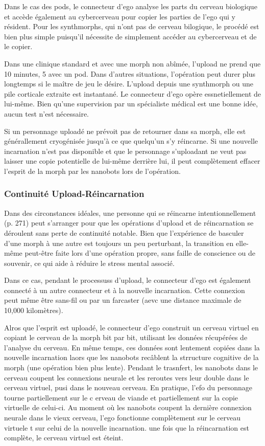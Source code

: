 Dans le cas des pods, le connecteur d'ego analyse les parts du cerveau biologique et accède également au cybercerveau pour copier les parties de l'ego qui y résident. Pour les synthmorphs, qui n'ont pas de cerveau bilogique, le procédé est bien plus simple puisqu'il nécessite de simplement accéder au cybercerveau et de le copier. 

Dans une clinique standard et avec une morph non abîmée, l'upload ne prend que 10 minutes, 5 avec un pod. Dans d'autres situations, l'opération peut durer plus longtemps si le maître de jeu le désire. L'upload depuis une synthmorph ou une pile corticale extraite est instantané. Le connecteur d'ego opère essnetiellement de lui-même. Bien qu'une supervision par un spécialiste médical est une bonne idée, aucun test n'est nécessaire. 

Si un personnage uploadé ne prévoit pas de retourner dans sa morph, elle est générallement cryogénisée jusqu'à ce que quelqu'un s'y réincarne. Si une nouvelle incarnation n'est pas disponible et que le personnage s'uploadant ne veut pas laisser une copie potentielle de lui-même derrière lui, il peut complètement effacer l'esprit de la morph par les nanobots lors de l'opération. 

\subsubsection{Continuité Upload-Réincarnation} 

Dans des circonstances idéales, une personne qui se réincarne intentionnellement (p. 271) peut s'arranger pour que les opérations d'upload et de réincarnation se déroulent sans perte de continuité notable. Bien que l'expérience de basculer d'une morph à une autre est toujours un peu perturbant, la transition en elle-même peut-être faite lors d'une opération propre, sans faille de conscience ou de souvenir, ce qui aide à réduire le stress mental associé. 

Dans ce cas, pendant le processuss d'upload, le connecteur d'ego est également connecté à un autre connecteur et à la nouvelle incarnation. Cette connexion peut même être sans-fil ou par un farcaster (aevc une distance maximale de 10,000 kilomètres). 

Alros que l'esprit est uploadé, le connecteur d'ego construit un cerveau virtuel en copiant le cerveau de la morph bit par bit, utilisant les données récupérées de l'analyse du cerveau. En même temps, ces données sont lentement copiées dans la nouvelle incarnation laors que les nanobots recâblent la strructure cognitive de la morph (une opération bien plus lente). Pendant le trasnfert, les nanobots dans le cerveau coupent les connexions neurale et les reroutes vers leur double dans le cerveau virtuel, pusi dans le nouveau cerveau. En pratique, l'efo du personnage tourne partiellement sur le c erveau de viande et partiellement sur la copie virtuelle de celui-ci. Au moment où les nanobots coupent la dernière connexion neurale dans le vieux cerveau, l'ego fonctionne complètement sur le cerveau virtuele t sur celui de la nouvelle incarnation. une fois que la réincarnation est complète, le cerveau virtuel est éteint. 

